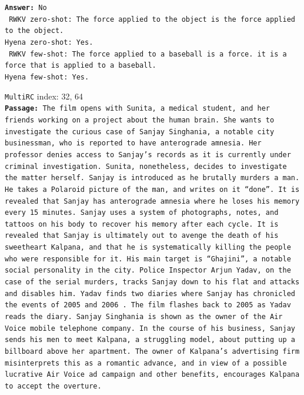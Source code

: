 \begin{tcolorbox}
    {\tt \textbf{Answer:} No} \\    

    {\tt {\color{red!80} RWKV zero-shot}: The force applied to the object is the force applied to the object.}  \\ 

    {\tt {\color{blue!80}Hyena zero-shot}: Yes.}  \\

    {\tt {\color{red!80} RWKV few-shot}: The force applied to a baseball is a force. it is a force that is applied to a baseball.} \\

    {\tt {\color{blue!80}Hyena few-shot}: Yes.} 
\end{tcolorbox}



\begin{tcolorbox}
    {\tt MultiRC} index: 32, 64 \\ 
    
    \small {\tt \textbf{Passage:} The film opens with Sunita, a medical student, and her friends working on a project about the human brain. She wants to investigate the curious case of Sanjay Singhania, a notable city businessman, who is reported to have anterograde amnesia.  Her professor denies access to Sanjay's records as it is currently under criminal investigation.  Sunita, nonetheless, decides to investigate the matter herself.  Sanjay is introduced as he brutally murders a man. He takes a Polaroid picture of the man, and writes on it ``done''.  It is revealed that Sanjay has anterograde amnesia where he loses his memory every 15 minutes.  Sanjay uses a system of photographs, notes, and tattoos on his body to recover his memory after each cycle.  It is revealed that Sanjay is ultimately out to avenge the death of his sweetheart Kalpana, and that he is systematically killing the people who were responsible for it.  His main target is ``Ghajini'', a notable social personality in the city. Police Inspector Arjun Yadav, on the case of the serial murders, tracks Sanjay down to his flat and attacks and disables him. Yadav finds two diaries where Sanjay has chronicled the events of 2005 and 2006 . The film flashes back to 2005 as Yadav reads the diary. Sanjay Singhania is shown as the owner of the Air Voice mobile telephone company. In the course of his business, Sanjay sends his men to meet Kalpana, a struggling model, about putting up a billboard above her apartment. The owner of Kalpana's advertising firm misinterprets this as a romantic advance, and in view of a possible lucrative Air Voice ad campaign and other benefits, encourages Kalpana to accept the overture.} \\ 
    

\end{tcolorbox}
